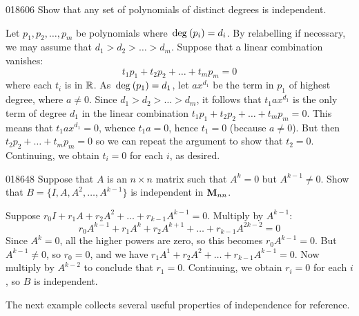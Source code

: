 \begin{example}{}{018606}
Show that any set of polynomials of distinct degrees is independent.

\begin{solution}
Let $p_{1}, p_{2}, \dots, p_{m}$ be polynomials where $\thinspace\operatorname{deg\medspace}(p_{i}) = d_{i}$. By relabelling if necessary, we may assume that $d_{1} > d_{2} > \dots > d_{m}$. Suppose that a linear combination vanishes:
\begin{equation*}
t_1p_1 + t_2p_2 + \dots + t_mp_m = 0
\end{equation*}
where each $t_{i}$ is in $\mathbb{R}$. As $\thinspace\operatorname{deg\medspace}(p_{1}) = d_{1}$, let $ax^{d_{1}}$ be the term in $p_{1}$ of highest degree, where $a \neq 0$. Since $d_{1} > d_{2} > \dots > d_{m}$, it follows that $t_{1}ax^{d_{1}}$ is the only term of degree $d_{1}$ in the linear combination $t_{1}p_{1} + t_{2}p_{2} + \dots + t_{m}p_{m} = 0$. This means that $t_{1}ax^{d_{1}} = 0$, whence $t_{1}a = 0$, hence $t_{1} = 0$ (because $a \neq 0$). But then $t_{2}p_{2} + \dots + t_{m}p_{m} = 0$ so we can repeat the argument to show that $t_{2} = 0$. Continuing, we obtain $t_{i} = 0$ for each $i$, as desired.
\end{solution} 
\end{example}

\begin{example}{}{018648}
Suppose that $A$ is an $n \times n$ matrix such that $A^{k} = 0$ but $A^{k-1} \neq 0$. Show that $B = \{I, A, A^{2}, \dots, A^{k-1}\}$ is independent in $\textbf{M}_{nn}$.

\begin{solution}
Suppose $r_{0}I + r_{1}A + r_{2}A^{2} + \dots + r_{k-1}A^{k-1} = 0$. Multiply by $A^{k-1}$:
\begin{equation*}
r_0A^{k - 1} + r_1A^k + r_2A^{k + 1} + \dots + r_{k-1}A^{2k-2} = 0
\end{equation*}
Since $A^{k} = 0$, all the higher powers are zero, so this becomes $r_{0}A^{k-1} = 0$. But $A^{k-1} \neq 0$, so $r_{0} = 0$, and we have $r_{1}A^{1} + r_{2}A^{2} + \dots + r_{k-1}A^{k-1} = 0$. Now multiply by $A^{k-2}$ to conclude that $r_{1} = 0$. Continuing, we obtain $r_{i} = 0$ for each $i$, so $B$ is independent.
\end{solution}
\end{example}

The next example collects several useful properties of independence for reference.

